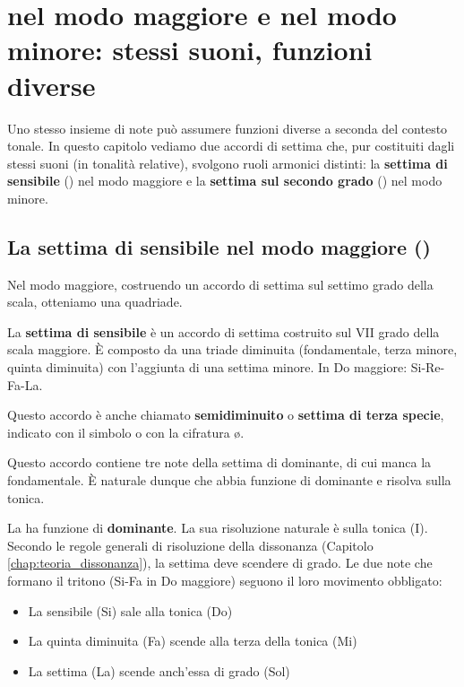 \chapter{ nel modo maggiore e  nel modo minore: stessi suoni, funzioni diverse}
\label{chap:vii7_ii7}

Uno stesso insieme di note può assumere funzioni diverse a seconda del contesto tonale. In questo capitolo vediamo due accordi di settima che, pur costituiti dagli stessi suoni (in tonalità relative), svolgono ruoli armonici distinti: la \textbf{settima di sensibile} () nel modo maggiore e la \textbf{settima sul secondo grado} () nel modo minore.

\section{La settima di sensibile nel modo maggiore ()}
\label{sec:vii7_maggiore}

Nel modo maggiore, costruendo un accordo di settima sul settimo grado della scala, otteniamo una quadriade.

\begin{definizione}
	\label{def:vii7}
	La \textbf{settima di sensibile} è un accordo di settima costruito sul VII grado della scala maggiore. È composto da una triade diminuita (fondamentale, terza minore, quinta diminuita) con l'aggiunta di una settima minore. In Do maggiore: Si-Re-Fa-La.
	
	Questo accordo è anche chiamato \textbf{semidiminuito} o \textbf{settima di terza specie}, indicato con il simbolo  o  con la cifratura {\o}.
\end{definizione}

Questo accordo contiene tre note della settima di dominante, di cui manca la fondamentale. È naturale dunque che abbia funzione di dominante e risolva sulla tonica.

\begin{regola}
	\label{reg:funzione_vii7}
	La  ha funzione di \textbf{dominante}. La sua risoluzione naturale è sulla tonica (I). Secondo le regole generali di risoluzione della dissonanza (Capitolo \ref{chap:teoria_dissonanza}), la settima deve scendere di grado. Le due note che formano il tritono (Si-Fa in Do maggiore) seguono il loro movimento obbligato:
	\begin{itemize}
		\item La sensibile (Si) sale alla tonica (Do)
		\item La quinta diminuita (Fa) scende alla terza della tonica (Mi)
		\item La settima (La) scende anch'essa di grado (Sol)
	\end{itemize}
\end{regola}

